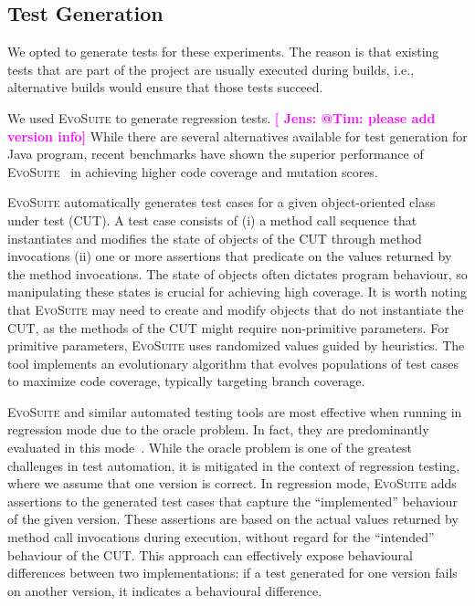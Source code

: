 \documentclass[conference]{IEEEtran}
\makeatletter
\newcommand{\evosuite}{\textsc{EvoSuite}\@\xspace}
\newcommand{\valerio}[1]{\textbf{\textcolor{blue}{[ \ding{46}Valerio: #1]}}}
\newcommand{\jens}[1]{\textbf{\textcolor{magenta}{[ \ding{46}Jens: #1]}}}
\makeatother
\begin{document}
\subsection{Test Generation}

We opted to generate tests for these experiments. The reason is that existing tests that are part of the project are usually executed during builds, i.e., alternative builds would ensure that those tests succeed. 

We used \evosuite to generate regression tests. \jens{@Tim: please add version info} While there are several alternatives available for test generation for Java program, recent benchmarks have shown the superior performance of \evosuite~\cite{jahangirova2023sbft} in achieving higher code coverage and mutation scores. 

\evosuite automatically generates test cases for a given object-oriented class under test (CUT). A test case consists of (i) a method call sequence that instantiates and modifies the state of objects of the CUT through method invocations (ii) one or more assertions that predicate on the values returned by the method invocations. The state of objects often dictates program behaviour, so manipulating these states is crucial for achieving high coverage. It is worth noting that \evosuite may need to create and modify objects that do not instantiate the CUT, as the methods of the CUT might require non-primitive parameters. For primitive parameters, \evosuite uses randomized values guided by heuristics. The tool implements an evolutionary algorithm that evolves populations of test cases to maximize code coverage, typically targeting branch coverage.

\evosuite and similar automated testing tools are most effective when running in regression mode due to the oracle problem. In fact, they are predominantly evaluated in this mode~\cite{jahangirova2023sbft,shamshiri2015automatically}. While the oracle problem is one of the greatest challenges in test automation, it is mitigated in the context of regression testing, where we assume that one version is correct. In regression mode, \evosuite adds assertions to the generated test cases that capture the ``implemented'' behaviour of the given version. These assertions are based on the actual values returned by method call invocations during execution, without regard for the ``intended'' behaviour of the CUT. This approach can effectively expose behavioural differences between two implementations: if a test generated for one version fails on another version, it indicates a behavioural difference.
\end{document}
